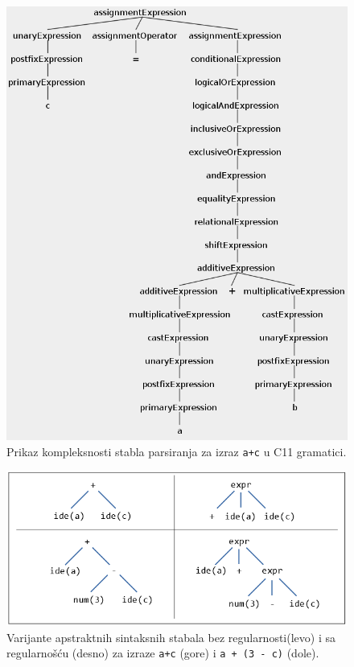 \begin{figure}[h!]
    \centering
    \includegraphics[scale=0.6]{images/parse_tree_expr.png}
    \caption{Prikaz kompleksnosti stabla parsiranja za izraz 
    \texttt{a+c} u C11 gramatici.} 
    \label{fig:CompilationProcessPars1}
\end{figure}

\begin{figure}[h!]
    \centering
    \includegraphics[scale=0.8]{images/ast.png}
    \caption{Varijante apstraktnih sintaksnih stabala bez regularnosti(levo) i sa regularnošću (desno) za izraze \texttt{a+c} (gore) i \texttt{a + (3 - c)} (dole).} 
    \label{fig:ASTSimple}
\end{figure}

